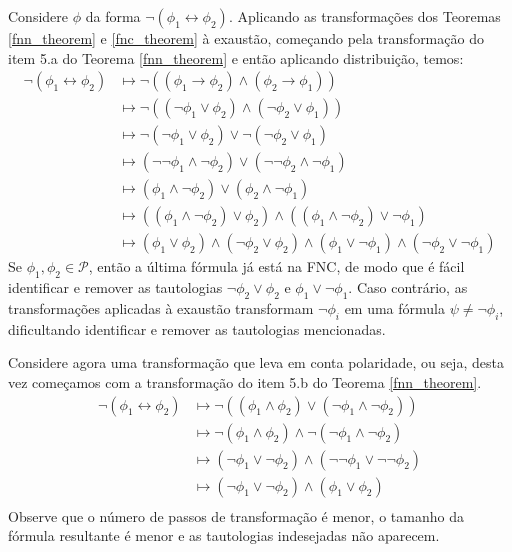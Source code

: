 \begin{example}
	\label{exemplo_fnn_fnc}
    Considere $\phi$ da forma $\neg(\phi_1 \leftrightarrow \phi_2)$. Aplicando as transformações dos Teoremas \ref{fnn_theorem} e \ref{fnc_theorem} à exaustão, começando pela transformação do item 5.a do Teorema \ref{fnn_theorem} e então aplicando distribuição, temos:
    \begin{equation*}
        \begin{split}
            \neg(\phi_1 \leftrightarrow \phi_2) & \longmapsto \neg((\phi_1 \rightarrow \phi_2) \wedge (\phi_2 \rightarrow \phi_1)) \\
                 & \longmapsto \neg((\neg \phi_1 \vee \phi_2) \wedge (\neg \phi_2 \vee \phi_1)) \\
                 & \longmapsto \neg(\neg \phi_1 \vee \phi_2) \vee \neg(\neg \phi_2 \vee \phi_1) \\
                 & \longmapsto (\neg \neg \phi_1 \wedge \neg \phi_2) \vee (\neg \neg \phi_2 \wedge \neg \phi_1) \\
                 & \longmapsto (\phi_1 \wedge \neg \phi_2) \vee (\phi_2 \wedge \neg \phi_1) \\
                 & \longmapsto ((\phi_1 \wedge \neg \phi_2) \vee \phi_2) \wedge ((\phi_1 \wedge \neg \phi_2) \vee \neg \phi_1) \\
                 & \longmapsto (\phi_1 \vee \phi_2) \wedge (\neg \phi_2 \vee \phi_2) \wedge (\phi_1 \vee \neg \phi_1) \wedge (\neg \phi_2 \vee \neg \phi_1)
        \end{split}
    \end{equation*}
    Se $\phi_1,\phi_2 \in \mathcal{P}$, então a última fórmula já está na FNC, de modo que é fácil identificar e remover as tautologias $\neg \phi_2 \vee \phi_2$ e $\phi_1 \vee \neg \phi_1$. Caso contrário, as transformações aplicadas à exaustão transformam $\neg \phi_i$ em uma fórmula $\psi \neq \neg \phi_i$, dificultando identificar e remover as tautologias mencionadas.
    
    Considere agora uma transformação que leva em conta polaridade, ou seja, desta vez começamos com a transformação do item 5.b do Teorema \ref{fnn_theorem}.
    \begin{equation*}
        \begin{split}
            \neg(\phi_1 \leftrightarrow \phi_2) & \longmapsto \neg((\phi_1 \wedge \phi_2) \vee (\neg \phi_1 \wedge \neg \phi_2)) \\
                 & \longmapsto \neg(\phi_1 \wedge \phi_2) \wedge \neg(\neg \phi_1 \wedge \neg \phi_2) \\
                 & \longmapsto (\neg \phi_1 \vee \neg \phi_2) \wedge (\neg \neg \phi_1 \vee \neg \neg \phi_2) \\
                 & \longmapsto (\neg \phi_1 \vee \neg \phi_2) \wedge (\phi_1 \vee \phi_2) \\
        \end{split}
    \end{equation*}
    Observe que o número de passos de transformação é menor, o tamanho da fórmula resultante é menor e as tautologias indesejadas não aparecem.
    

\end{example}
